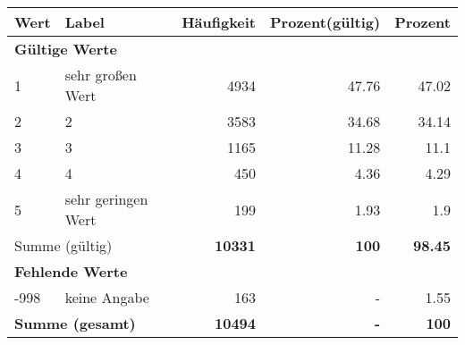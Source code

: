      \begin{longtable}{lXrrr}
     \toprule
     \textbf{Wert} & \textbf{Label} & \textbf{Häufigkeit} & \textbf{Prozent(gültig)} & \textbf{Prozent} \\
     \endhead
     \midrule
     \multicolumn{5}{l}{\textbf{Gültige Werte}}\\

     1 &
     \multicolumn{1}{X}{ sehr großen Wert   } &


       \num{4934} &
       \num[round-mode=places,round-precision=2]{47,76} &
         \num[round-mode=places,round-precision=2]{47,02} \\

     2 &
     \multicolumn{1}{X}{ 2   } &


       \num{3583} &
       \num[round-mode=places,round-precision=2]{34,68} &
         \num[round-mode=places,round-precision=2]{34,14} \\

     3 &
     \multicolumn{1}{X}{ 3   } &


       \num{1165} &
       \num[round-mode=places,round-precision=2]{11,28} &
         \num[round-mode=places,round-precision=2]{11,1} \\

     4 &
     \multicolumn{1}{X}{ 4   } &


       \num{450} &
       \num[round-mode=places,round-precision=2]{4,36} &
         \num[round-mode=places,round-precision=2]{4,29} \\

     5 &
     \multicolumn{1}{X}{ sehr geringen Wert   } &


       \num{199} &
       \num[round-mode=places,round-precision=2]{1,93} &
         \num[round-mode=places,round-precision=2]{1,9} \\
     \midrule
     \multicolumn{2}{l}{Summe (gültig)} &
       \textbf{\num{10331}} &
     \textbf{100} &
       \textbf{\num[round-mode=places,round-precision=2]{98,45}} \\
     \multicolumn{5}{l}{\textbf{Fehlende Werte}}\\
       -998 &
       keine Angabe &
         \num{163} &
        - &
         \num[round-mode=places,round-precision=2]{1,55} \\
     \midrule
     \multicolumn{2}{l}{\textbf{Summe (gesamt)}} &
          \textbf{\num{10494}} &
        \textbf{-} &
        \textbf{100} \\
     \bottomrule
     \end{longtable}
     
